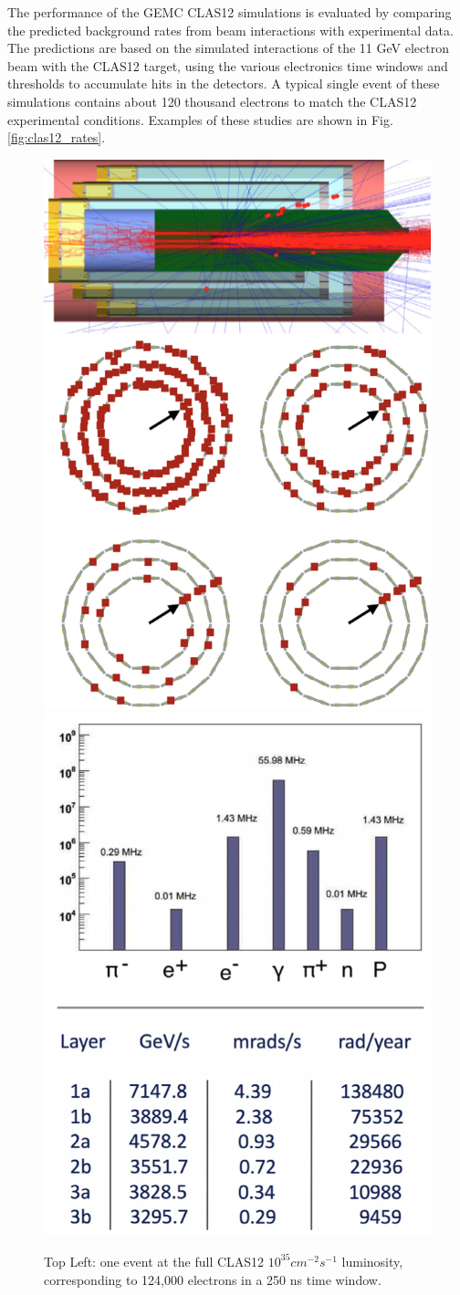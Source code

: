 The performance of the GEMC CLAS12 simulations is evaluated by comparing the predicted background
rates from beam interactions with experimental data.
The predictions are based on the simulated interactions of the 11 GeV electron beam
with the CLAS12 target, using the various electronics time windows and thresholds
to accumulate hits in the detectors.
A typical single event of these simulations contains about 120 thousand electrons to match
the CLAS12 experimental conditions. Examples of these studies are shown in Fig.\ref{fig:clas12_rates}.

\begin{figure}[h]
    \centering
    \includegraphics[width=.48\textwidth]{img/c12_rates}
    \includegraphics[width=.48\textwidth]{img/c12_bst}
    \caption{
        Top Left: one event at the full CLAS12 $10^{35} cm^{-2} s^{-1}$
        luminosity, corresponding to 124,000 electrons in a 250 ns time window.
}
\end{figure}

